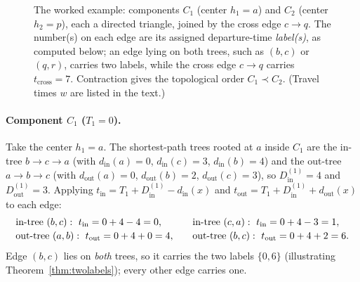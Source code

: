 \documentclass[11pt]{article}
\theoremstyle{definition}
\theoremstyle{remark}
\newcommand{\din}{d_{\mathrm{in}}}
\newcommand{\dout}{d_{\mathrm{out}}}
\begin{document}
\begin{figure}[H]
\centering
{}
\caption{The worked example: components $C_1$ (center $h_1=a$) and $C_2$ (center $h_2=p$), each a
directed triangle, joined by the cross edge $c\to q$. The number(s) on each edge are its assigned
departure-time \emph{label(s)}, as computed below; an edge lying on both trees, such as $(b,c)$ or
$(q,r)$, carries two labels, while the cross edge $c\to q$ carries $t_{\mathrm{cross}}=7$. Contraction
gives the topological order $C_1\prec C_2$. (Travel times $w$ are listed in the text.)}
\label{fig:example}
\end{figure}

\paragraph{Component $C_1$ ($T_1=0$).} Take the center $h_1=a$. The shortest-path trees rooted at $a$
inside $C_1$ are the in-tree $b\to c\to a$ (with $\din(a)=0$, $\din(c)=3$, $\din(b)=4$) and the
out-tree $a\to b\to c$ (with $\dout(a)=0$, $\dout(b)=2$, $\dout(c)=3$), so $D^{(1)}_{\mathrm{in}}=4$ and
$D^{(1)}_{\mathrm{out}}=3$. Applying $t_{\mathrm{in}}=T_1+D^{(1)}_{\mathrm{in}}-\din(x)$ and
$t_{\mathrm{out}}=T_1+D^{(1)}_{\mathrm{in}}+\dout(x)$ to each edge:
\[
  \begin{array}{l@{\qquad}l}
    \text{in-tree }(b,c):\ t_{\mathrm{in}}=0+4-4=0,  & \text{in-tree }(c,a):\ t_{\mathrm{in}}=0+4-3=1,\\[2pt]
    \text{out-tree }(a,b):\ t_{\mathrm{out}}=0+4+0=4, & \text{out-tree }(b,c):\ t_{\mathrm{out}}=0+4+2=6.
  \end{array}
\]
Edge $(b,c)$ lies on \emph{both} trees, so it carries the two labels $\{0,6\}$ (illustrating
Theorem~\ref{thm:twolabels}); every other edge carries one.
\end{document}
